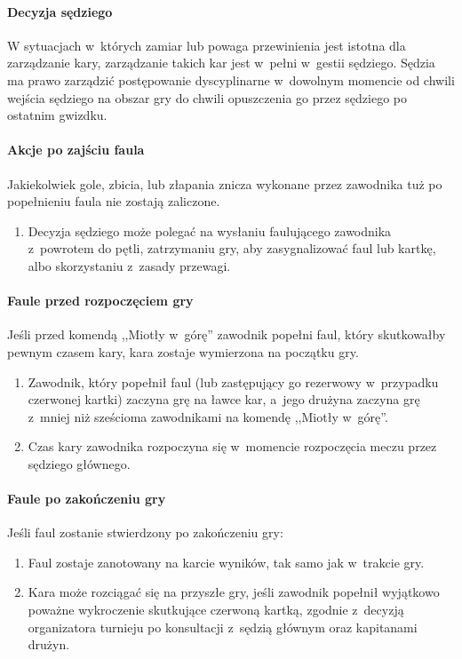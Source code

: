 \documentclass[12pt,a4paper]{article}
\begin{document}
\paragraph{Decyzja sędziego}
W sytuacjach w~których zamiar lub
powaga przewinienia jest istotna dla zarządzanie kary, zarządzanie
takich kar jest w~pełni w~gestii sędziego. Sędzia ma prawo zarządzić
postępowanie dyscyplinarne w~dowolnym momencie od chwili wejścia
sędziego na obszar gry do chwili opuszczenia go przez sędziego po
ostatnim gwizdku.

\paragraph{Akcje po zajściu faula}
Jakiekolwiek gole, zbicia,
lub złapania znicza wykonane przez zawodnika tuż po popełnieniu faula
nie zostają zaliczone.

\begin{enumerate}
	\item
	      Decyzja sędziego może polegać na wysłaniu faulującego
	      zawodnika z~powrotem do pętli, zatrzymaniu gry, aby zasygnalizować
	      faul lub kartkę, albo skorzystaniu z~zasady przewagi.
\end{enumerate}

\paragraph{Faule przed rozpoczęciem gry}
Jeśli przed komendą
,,Miotły w~górę'' zawodnik popełni faul, który skutkowałby pewnym
czasem kary, kara zostaje wymierzona na początku gry.

\begin{enumerate}
	\item Zawodnik, który popełnił faul (lub zastępujący go rezerwowy w~przypadku czerwonej kartki) zaczyna grę na ławce kar, a~jego drużyna
	      zaczyna grę z~mniej niż sześcioma zawodnikami na komendę ,,Miotły w~górę''.

	\item Czas kary zawodnika rozpoczyna się w~momencie rozpoczęcia meczu przez
	      sędziego głównego.
\end{enumerate}

\paragraph{Faule po zakończeniu gry}
Jeśli faul zostanie
stwierdzony po zakończeniu gry:

\begin{enumerate}
	\item Faul zostaje zanotowany na karcie wyników, tak samo jak w~trakcie
	      gry.

	\item Kara może rozciągać się na przyszłe gry, jeśli zawodnik popełnił
	      wyjątkowo poważne wykroczenie skutkujące czerwoną kartką, zgodnie z~decyzją organizatora turnieju po konsultacji z~sędzią głównym oraz
	      kapitanami drużyn.
\end{enumerate}
\end{document}
